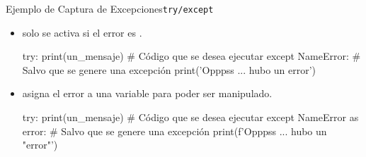 \documentclass[10pt, envcountsect , spanish]{beamer}
\begin{document}
\begin{frame}[fragile]{Ejemplo de Captura de Excepciones}{\tt try/except}
\unEjemplo 
\small

\begin{itemize}

\item {} solo se activa si el error es .
\begin{pyconsole}[][frame=single, fontsize=\scriptsize]
try:
    print(un_mensaje)  # Código que se desea ejecutar
except NameError:                # Salvo que se genere una excepción
    print('Opppss ... hubo un error')

\end{pyconsole}



\item {} asigna el error a una variable para poder ser manipulado.

\begin{pyconsole}[][frame=single, fontsize=\scriptsize]
try:
    print(un_mensaje)  # Código que se desea ejecutar
except NameError as error: # Salvo que se genere una excepción
    print(f'Opppss ... hubo un "{error}"')

\end{pyconsole}

\end{itemize}
\end{frame}
\end{document}

